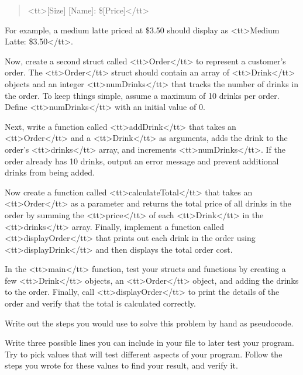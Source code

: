 {{{{{{{{{{{\begin{quote}
<tt>[Size] [Name]: \$[Price]</tt>
\end{quote}

For example, a medium latte priced at \$3.50 should display as <tt>Medium Latte: \$3.50</tt>.

Now, create a second struct called <tt>Order</tt> to represent a customer’s order. The <tt>Order</tt> struct should contain an array of <tt>Drink</tt> objects and an integer <tt>numDrinks</tt> that tracks the number of drinks in the order. To keep things simple, assume a maximum of 10 drinks per order. Define <tt>numDrinks</tt> with an initial value of 0.

Next, write a function called <tt>addDrink</tt> that takes an <tt>Order</tt> and a <tt>Drink</tt> as arguments, adds the drink to the order’s <tt>drinks</tt> array, and increments <tt>numDrinks</tt>. If the order already has 10 drinks, output an error message and prevent additional drinks from being added.

Now create a function called <tt>calculateTotal</tt> that takes an <tt>Order</tt> as a parameter and returns the total price of all drinks in the order by summing the <tt>price</tt> of each <tt>Drink</tt> in the <tt>drinks</tt> array. Finally, implement a function called <tt>displayOrder</tt> that prints out each drink in the order using <tt>displayDrink</tt> and then displays the total order cost.

In the <tt>main</tt> function, test your structs and functions by creating a few <tt>Drink</tt> objects, an <tt>Order</tt> object, and adding the drinks to the order. Finally, call <tt>displayOrder</tt> to print the details of the order and verify that the total is calculated correctly.

\begin{multipart}
    Write out the steps you would use to solve this problem by hand as pseudocode.
\end{multipart}

\vspace{8cm}

\begin{multipart}
    Write three possible lines you can include in your file to later test your program. Try to pick values that will test different aspects of your program. Follow the steps you wrote for these values to find your result, and verify it.
\end{multipart}

\vspace{5cm}

}}}}}}}}}}}
